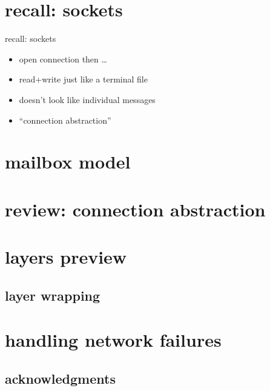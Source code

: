 

\section{recall: sockets}

\begin{frame}{recall: sockets}
    \begin{itemize}
    \item open connection then \ldots \\
    \item read+write just like a terminal file
    \vspace{.5cm}
    \item doesn't look like individual messages
    \item ``connection abstraction''
    \end{itemize}
\end{frame}

\section{mailbox model}


\section{review: connection abstraction}



\section{layers preview}


\subsection{layer wrapping}


\section{handling network failures}


\subsection{acknowledgments}


